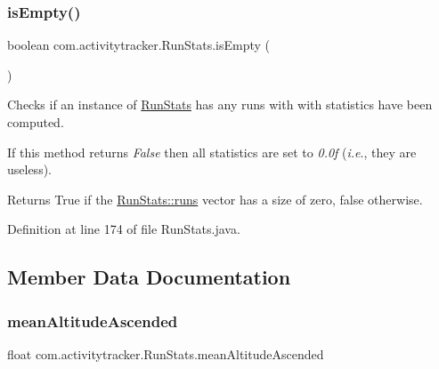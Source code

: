 \subsubsection{\texorpdfstring{isEmpty()}{isEmpty()}}
{\footnotesize\ttfamily boolean com.\+activitytracker.\+Run\+Stats.\+is\+Empty (\begin{DoxyParamCaption}{ }\end{DoxyParamCaption})}

Checks if an instance of \mbox{\hyperlink{classcom_1_1activitytracker_1_1_run_stats}{Run\+Stats}} has any runs with with statistics have been computed.

If this method returns {\itshape False} then all statistics are set to {\itshape 0.\+0f} ({\itshape i.\+e}., they are useless).

\begin{DoxyReturn}{Returns}
True if the \mbox{\hyperlink{classcom_1_1activitytracker_1_1_run_stats_a0fd429e9f463ddf4897c507c0e3c0a12}{Run\+Stats\+::runs}} vector has a size of zero, false otherwise. 
\end{DoxyReturn}


Definition at line 174 of file Run\+Stats.\+java.


\begin{DoxyCode}{0}

\end{DoxyCode}


\subsection{Member Data Documentation}
\mbox{\label{classcom_1_1activitytracker_1_1_run_stats_aecbe62c15075fe9be1604333c355fab6}} 
\subsubsection{\texorpdfstring{meanAltitudeAscended}{meanAltitudeAscended}}
{\footnotesize\ttfamily float com.\+activitytracker.\+Run\+Stats.\+mean\+Altitude\+Ascended\hspace{0.3cm}{\ttfamily [private]}}


